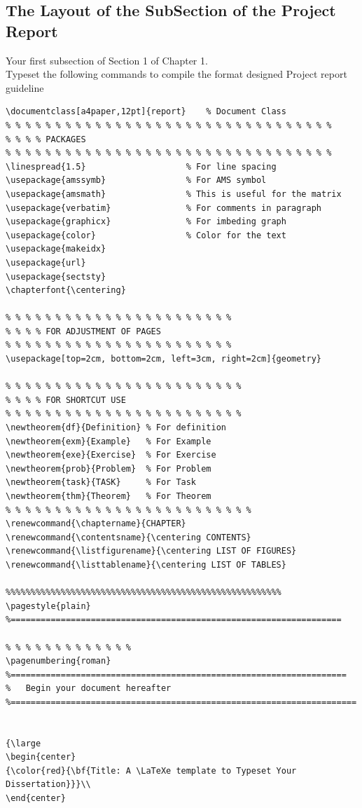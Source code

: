 \subsection{\bf The Layout of the  SubSection of the Project Report}
Your first subsection of Section 1 of Chapter 1. \\
{\color{blue} Typeset the following commands to compile the format designed Project report guideline}
\begin{verbatim}
\documentclass[a4paper,12pt]{report}    % Document Class
% % % % % % % % % % % % % % % % % % % % % % % % % % % % % % % % %
% % % % PACKAGES
% % % % % % % % % % % % % % % % % % % % % % % % % % % % % % % % %
\linespread{1.5}                    % For line spacing
\usepackage{amssymb}                % For AMS symbol
\usepackage{amsmath}                % This is useful for the matrix 
\usepackage{verbatim}               % For comments in paragraph
\usepackage{graphicx}               % For imbeding graph
\usepackage{color}                  % Color for the text
\usepackage{makeidx}
\usepackage{url}
\usepackage{sectsty}
\chapterfont{\centering}

% % % % % % % % % % % % % % % % % % % % % % %
% % % % FOR ADJUSTMENT OF PAGES
% % % % % % % % % % % % % % % % % % % % % % %
\usepackage[top=2cm, bottom=2cm, left=3cm, right=2cm]{geometry}

% % % % % % % % % % % % % % % % % % % % % % % %
% % % % FOR SHORTCUT USE
% % % % % % % % % % % % % % % % % % % % % % % %
\newtheorem{df}{Definition} % For definition
\newtheorem{exm}{Example}   % For Example
\newtheorem{exe}{Exercise}  % For Exercise
\newtheorem{prob}{Problem}  % For Problem
\newtheorem{task}{TASK}     % For Task
\newtheorem{thm}{Theorem}   % For Theorem
% % % % % % % % % % % % % % % % % % % % % % % % %
\renewcommand{\chaptername}{CHAPTER}
\renewcommand{\contentsname}{\centering CONTENTS}
\renewcommand{\listfigurename}{\centering LIST OF FIGURES}
\renewcommand{\listtablename}{\centering LIST OF TABLES}

%%%%%%%%%%%%%%%%%%%%%%%%%%%%%%%%%%%%%%%%%%%%%%%%%%%%%%%
\pagestyle{plain}
%==================================================================

% % % % % % % % % % % % %
\pagenumbering{roman}
%===================================================================
%   Begin your document hereafter
%=====================================================================


{\large
\begin{center}
{\color{red}{\bf{Title: A \LaTeXe template to Typeset Your Dissertation}}}\\
\end{center}



\end{verbatim}
